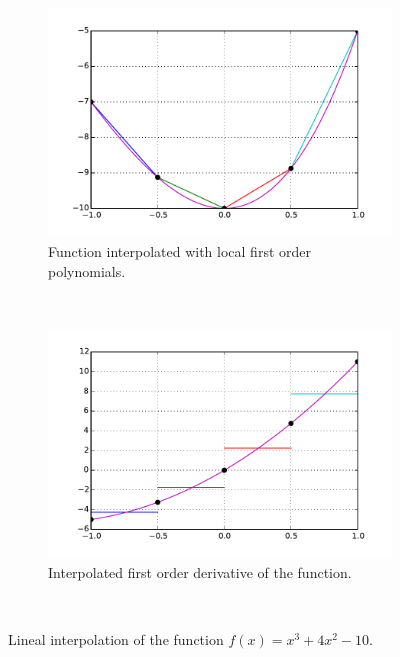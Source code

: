 \begin{figure}[H]
\centering
	\begin{subfigure}[b]{0.45\textwidth}\qquad
		\includegraphics[width=\textwidth]{localfun.pdf}
		\caption{Function interpolated with local first order polynomials. }
	\end{subfigure}\,
%
	\begin{subfigure}[b]{0.45\textwidth}\qquad
		\includegraphics[width=\textwidth]{localfirst.pdf}
		\caption{Interpolated first order derivative of the function.}
	\end{subfigure}\\

\caption{Lineal interpolation of the function $f(x) = {x^3} + 4{x^2} - 10$.}
\label{fig:fully local}
\end{figure}


